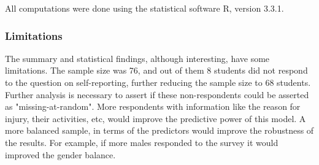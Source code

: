 \documentclass[12]{article}
\begin{document}
% 
% 
% 

All computations were done using the statistical software R, version 3.3.1.

\subsubsection*{Limitations}
The summary and statistical findings, although interesting, have some limitations. The sample size was 76, and out of them 8 students did not respond to the question on self-reporting, further reducing the sample size to 68 students. Further analysis is necessary to assert if these non-respondents could be asserted as "missing-at-random". More respondents with information like the reason for injury, their activities, etc, would improve the predictive power of this model. A more balanced sample, in terms of the predictors would improve the robustness of the results. For example, if more males responded to the survey it would improved the gender balance. 
\end{document}
